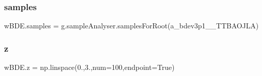 \mbox{\label{namespacewBDE_a190e9eea8c62fbd77ea21769fa8bcd6e}} 
\subsubsection{\texorpdfstring{samples}{samples}}
{\footnotesize\ttfamily w\+B\+D\+E.\+samples = g.\+sample\+Analyser.\+samples\+For\+Root(\textquotesingle{}a\+\_\+bdev3p1\+\_\+\_\+\+T\+T\+B\+A\+O\+J\+LA\textquotesingle{})}

\mbox{\label{namespacewBDE_a3d15e9460ee2d4f60060c201c3fc9a92}} 
\subsubsection{\texorpdfstring{z}{z}}
{\footnotesize\ttfamily w\+B\+D\+E.\+z = np.\+linspace(0.,3.,num=100,endpoint=True)}

